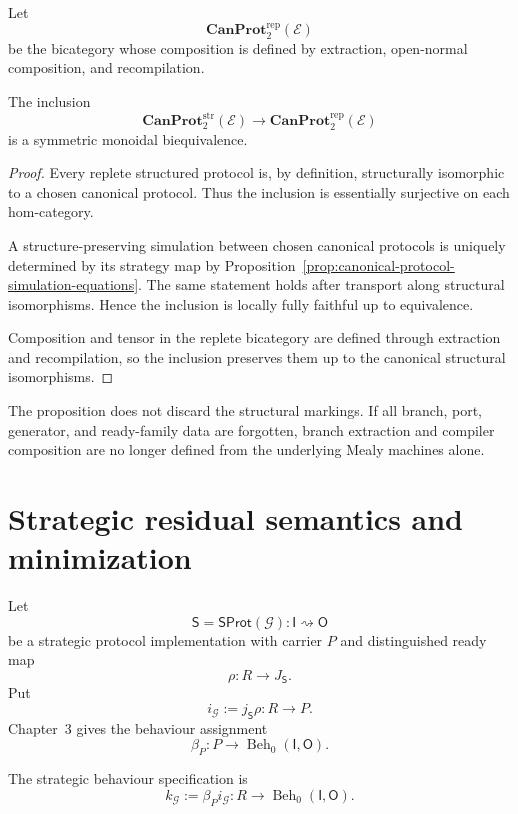 Let
\[
  \mathbf{CanProt}^{\mathrm{rep}}_2(\mathcal E)
\]
be the bicategory whose composition is defined by extraction, open-normal composition, and
recompilation.

\begin{proposition}
\label{prop:replete-presentation-biequivalence}
The inclusion
\[
  \mathbf{CanProt}^{\mathrm{str}}_2(\mathcal E)
  \longrightarrow
  \mathbf{CanProt}^{\mathrm{rep}}_2(\mathcal E)
\]
is a symmetric monoidal biequivalence.
\end{proposition}

\begin{proof}
Every replete structured protocol is, by definition, structurally isomorphic to a chosen canonical
protocol. Thus the inclusion is essentially surjective on each hom-category.

A structure-preserving simulation between chosen canonical protocols is uniquely determined by its
strategy map by Proposition~\ref{prop:canonical-protocol-simulation-equations}. The same statement
holds after transport along structural isomorphisms. Hence the inclusion is locally fully faithful
up to equivalence.

Composition and tensor in the replete bicategory are defined through extraction and recompilation,
so the inclusion preserves them up to the canonical structural isomorphisms.
\end{proof}

The proposition does not discard the structural markings. If all branch, port, generator, and
ready-family data are forgotten, branch extraction and compiler composition are no longer defined
from the underlying Mealy machines alone.

\section{Strategic residual semantics and minimization}
\label{sec:strategic-residual-semantics}

Let
\[
  \mathsf S=
  \mathsf{SProt}(\mathcal G):
  \mathsf I\rightsquigarrow\mathsf O
\]
be a strategic protocol implementation with carrier \(P\) and distinguished ready map
\[
  \rho:R\longrightarrow J_{\mathsf S}.
\]
Put
\[
  i_{\mathcal G}
  :=
  j_{\mathsf S}\rho:
  R\longrightarrow P.
\]
Chapter~3 gives the behaviour assignment
\[
  \beta_P:
  P
  \longrightarrow
  \operatorname{Beh}_0(\mathsf I,\mathsf O).
\]

\begin{definition}
\label{def:strategic-behaviour-specification}
The strategic behaviour specification is
\[
  k_{\mathcal G}
  :=
  \beta_Pi_{\mathcal G}:
  R
  \longrightarrow
  \operatorname{Beh}_0(\mathsf I,\mathsf O).
\]
\end{definition}

